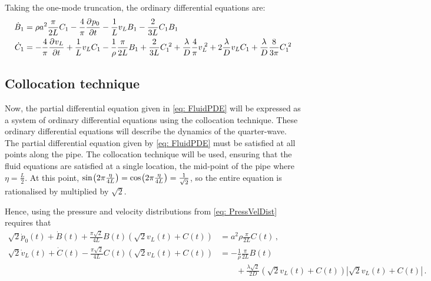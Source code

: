 Taking the one-mode truncation, the ordinary differential equations are:
~
\begin{equation*}
\begin{split}
    \dot{B}_1 &= \rho a^2 \frac{\pi}{2 L} C_1 - \frac{4}{\pi} \pdiff{p_0}{t} - \frac{1}{L} v_L B_1 - \frac{2}{3L} C_1 B_1
    \\
    \dot{C}_1 &= - \frac{4}{\pi} \pdiff{v_L}{t} + \frac{1}{L} v_L C_1 - \frac{1}{\rho} \frac{\pi}{2L} B_1 + \frac{2}{3L} C_1\power{2} + \frac{\lambda}{D} \frac{4}{\pi} v_L\power{2} + 2 \frac{\lambda}{D} v_L C_1 + \frac{\lambda}{D} \frac{8}{3 \pi} C_1\power{2}
\end{split}
\end{equation*}

\subsection{Collocation technique}

Now, the partial differential equation given in \cref{eq: FluidPDE} will be expressed as a system of ordinary differential equations using the collocation technique. These ordinary differential equations will describe the dynamics of the quarter-wave. The partial differential equation given by \cref{eq: FluidPDE} must be satisfied at all points along the pipe. The collocation technique will be used, ensuring that the fluid equations are satisfied at a single location, the mid-point of the pipe where $\eta = \frac{L}{2}$. At this point, $\fun{sin}{2 \pi \frac{\eta}{4L}} = \fun{cos}{2 \pi \frac{\eta}{4L}} = \frac{1}{\sqrt{2}}$, so the entire equation is rationalised by multiplied by $\sqrt{2}$.

Hence, using the pressure and velocity distributions from \cref{eq: PressVelDist} requires that
~
\begin{equation*}
\begin{split}
    \sqrt{2} \dot{p}_0(t) + \dot{B}(t) + \frac{\pi \sqrt{2}}{4 L} B(t) \left( \sqrt{2} v_L(t) + C(t) \right) &= a^2 \rho \frac{\pi}{2L} C(t) \, , \\
    \sqrt{2} \dot{v}_L(t) + \dot{C}(t) - \frac{\pi \sqrt{2}}{4 L} C(t) \left( \sqrt{2} v_L(t) + C(t) \right) &= - \frac{1}{\rho} \frac{\pi}{2 L} B(t) \\
    &\qquad + \frac{\lambda \sqrt{2}}{2D} \left( \sqrt{2} v_L(t) + C(t) \right) \left| \sqrt{2} v_L(t) + C(t) \right| \, .
\end{split}
\end{equation*}


